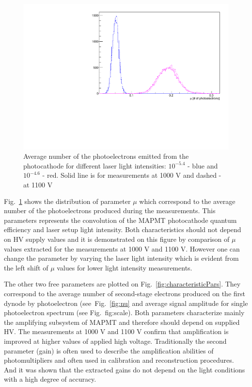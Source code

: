 \begin{figure}[bt]
	\centering
	\begin{tcolorbox}[halign=center,colback=white,colbacktitle=red!40!white,colframe=red!80!white,left=0pt,right=0pt,top=0pt,bottom=0pt,boxrule=4pt,title={\bfseries\color{black}OLD data, to be removed}]
	\includegraphics[width=0.8\linewidth]{figures/mu.pdf}
	\caption{Average number of the photoelectrons emitted from the photocathode for different laser light intensities: $10^{-5.4}$ - blue and $10^{-4.6}$ - red. Solid line is for measurements at 1000 V and dashed - at 1100 V}
	\label{fig:mu}
	\end{tcolorbox}
\end{figure}

Fig.~\ref{fig:mu} shows the distribution of parameter $\mu$ which correspond to the average number of the photoelectrons produced during the measurements.
This parameters represents the convolution of the MAPMT photocathode quantum efficiency and laser setup light intensity.
Both characteristics should not depend on HV supply values and it is demonstrated on this figure by comparison of $\mu$ values extracted for the measurements at 1000 V and 1100 V.
However one can change the parameter by varying the laser light intensity which is evident from the left shift of $\mu$ values for lower light intensity measurements.

The other two free parameters are plotted on Fig.~\ref{fig:characteristicPars}.
They correspond to the average number of second-stage electrons produced on the first dynode by photoelectron (see~Fig.~\ref{fig:nu} and average signal amplitude for single photoelectron spectrum (see Fig.~{fig:scale}).
Both parameters characterize mainly the amplifying subsystem of MAPMT and therefore should depend on supplied HV.
The measurements at 1000 V and 1100 V confirm that amplification is improved at higher values of applied high voltage.
Traditionally the second parameter (gain) is often used to describe the amplification abilities of photomultipliers and often used in calibration and reconstruction procedures.
And it was shown that the extracted gains do not depend on the light conditions with a high degree of accuracy.

